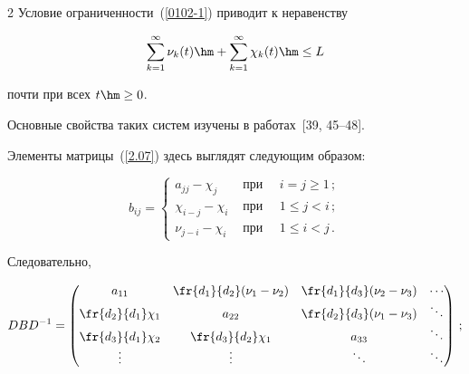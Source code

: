\begin{multicols}{2}
Условие ограниченности~(\ref{0102-1}) приводит к неравенству

$$

\sum\limits_{k=1}^{\infty}\nu_k(t)\hm + \sum\limits_{k=1}^{\infty} \chi_{k}(t) \hm \le L

$$

почти при всех $t \hm\ge 0$.



Основные свойства таких систем изучены в  работах~[39, 45--48].



Элементы матрицы~(\ref{2.07}) здесь выглядят сле\-ду\-ющим образом:

\begin{equation*}

b_{ij} = \begin{cases}

 a_{jj}-\chi_j  & \mbox { при } \quad i=j \ge 1\,; \\

\chi_{i-j}-\chi_i  & \mbox { при } \quad 1 \le j < i\,; \\

\nu_{j-i}-\chi_i  & \mbox { при } \quad 1 \le i < j \,.

\end{cases} %

\end{equation*}

Следовательно,

\begin{equation*}

DBD^{-1}=\begin{pmatrix}

a_{11} & \fr{d_{1}}{d_2}(\nu_1-\nu_2) & \fr{d_1}{d_3}(\nu_2-\nu_3) & \cdots  \\

\fr{d_{2}}{d_1}\chi_1 & a_{22} & \fr{d_{2}}{d_3}(\nu_1-\nu_3) &  \ddots \\

\fr{d_{3}}{d_1}\chi_2 & \fr{d_{3}}{d_2}\chi_1 &   a_{33} &  \ddots   \\

\vdots & \vdots & \ddots & \ddots

\end{pmatrix}\,;

\end{equation*}



\vspace*{-12pt}




\end{multicols}
